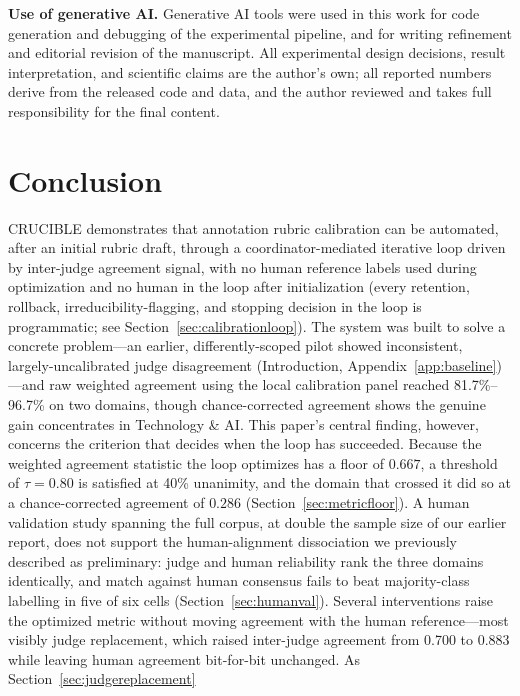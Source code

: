 \documentclass[11pt]{article}
\begin{document}
\textbf{Use of generative AI.} Generative AI tools were used in this work
for code generation and debugging of the experimental pipeline, and for
writing refinement and editorial revision of the manuscript. All
experimental design decisions, result interpretation, and scientific
claims are the author's own; all reported numbers derive from the
released code and data, and the author reviewed and takes full
responsibility for the final content.

\section{Conclusion}

CRUCIBLE demonstrates that annotation rubric calibration can be automated, after an initial rubric draft,
through a coordinator-mediated iterative loop driven by inter-judge
agreement signal, with no human reference labels used during optimization
and no human in the loop after initialization (every retention, rollback,
irreducibility-flagging, and stopping decision in the loop is programmatic;
see Section~\ref{sec:calibrationloop}). The
system was built to solve a concrete problem---an earlier, differently-scoped
pilot showed inconsistent, largely-uncalibrated judge disagreement
(Introduction, Appendix~\ref{app:baseline})---and raw weighted agreement
using the local calibration panel reached 81.7\%--96.7\% on two domains,
though chance-corrected agreement shows the genuine gain concentrates in
Technology \& AI. This paper's central finding, however, concerns the criterion that decides
when the loop has succeeded. Because the weighted agreement statistic the
loop optimizes has a floor of $0.667$, a threshold of $\tau = 0.80$ is
satisfied at 40\% unanimity, and the domain that crossed it did so at a
chance-corrected agreement of $0.286$ (Section~\ref{sec:metricfloor}). A
human validation study spanning the full corpus, at double the sample size
of our earlier report, does not support the human-alignment dissociation
we previously described as preliminary: judge and human reliability rank
the three domains identically, and match against human consensus fails to
beat majority-class labelling in five of six cells
(Section~\ref{sec:humanval}). Several interventions raise the optimized
metric without moving agreement with the human reference---most visibly
judge replacement, which raised inter-judge agreement from 0.700 to 0.883
while leaving human agreement bit-for-bit unchanged. As Section~\ref{sec:judgereplacement}
\end{document}

